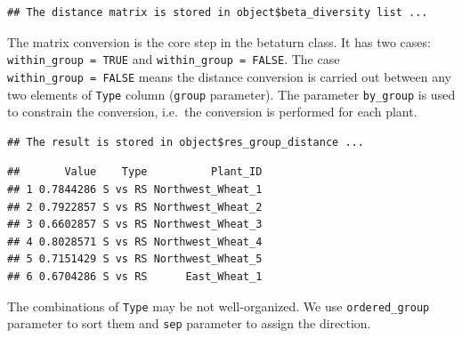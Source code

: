 \documentclass[
]{book}
\newenvironment{Shaded}{\begin{snugshade}}{\end{snugshade}}
\newcommand{\AttributeTok}[1]{\textcolor[rgb]{0.77,0.63,0.00}{#1}}
\newcommand{\ConstantTok}[1]{\textcolor[rgb]{0.00,0.00,0.00}{#1}}
\newcommand{\FunctionTok}[1]{\textcolor[rgb]{0.00,0.00,0.00}{#1}}
\newcommand{\NormalTok}[1]{#1}
\newcommand{\SpecialCharTok}[1]{\textcolor[rgb]{0.00,0.00,0.00}{#1}}
\newcommand{\StringTok}[1]{\textcolor[rgb]{0.31,0.60,0.02}{#1}}
\begin{document}
\begin{verbatim}
## The distance matrix is stored in object$beta_diversity list ...
\end{verbatim}

The matrix conversion is the core step in the betaturn class.
It has two cases: \texttt{within\_group\ =\ TRUE} and \texttt{within\_group\ =\ FALSE}.
The case \texttt{within\_group\ =\ FALSE} means the distance conversion is carried out between any two elements of \texttt{Type} column (\texttt{group} parameter).
The parameter \texttt{by\_group} is used to constrain the conversion, i.e.~the conversion is performed for each plant.

\begin{Shaded}
\end{Shaded}

\begin{verbatim}
## The result is stored in object$res_group_distance ...
\end{verbatim}

\begin{Shaded}
\end{Shaded}

\begin{verbatim}
##       Value    Type          Plant_ID
## 1 0.7844286 S vs RS Northwest_Wheat_1
## 2 0.7922857 S vs RS Northwest_Wheat_2
## 3 0.6602857 S vs RS Northwest_Wheat_3
## 4 0.8028571 S vs RS Northwest_Wheat_4
## 5 0.7151429 S vs RS Northwest_Wheat_5
## 6 0.6704286 S vs RS      East_Wheat_1
\end{verbatim}

The combinations of \texttt{Type} may be not well-organized. We use \texttt{ordered\_group} parameter to sort them and \texttt{sep} parameter to assign the direction.

\begin{Shaded}
\end{Shaded}
\end{document}
